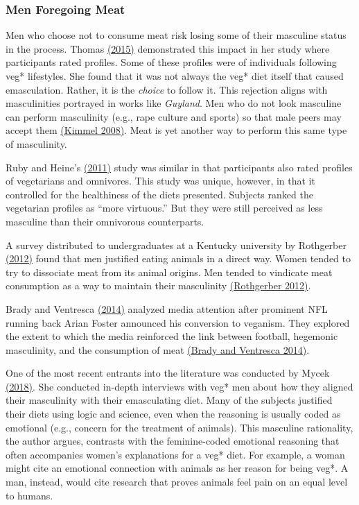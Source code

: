 \documentclass[twoside]{report}
\begin{document}
\subsubsection{Men Foregoing Meat}

Men who choose not to consume meat risk losing some of their masculine
status in the process. Thomas \hyperlink{thomas}{(2015)} demonstrated this impact in her study where participants rated profiles. Some of these profiles were of individuals following veg* lifestyles. She found that it was not always the veg* diet itself that caused emasculation. Rather, it is the
\emph{choice} to follow it. This rejection aligns with masculinities
portrayed in works like \emph{Guyland}. Men who do not look masculine can perform masculinity (e.g., rape culture and sports) so that male peers may accept them \hyperlink{kimmel}{(Kimmel 2008)}. Meat is yet another way
to perform this same type of masculinity.

Ruby and Heine's \hyperlink{ruby}{(2011)} study was similar in that participants also rated profiles of vegetarians and omnivores. This study was unique, however, in that it controlled for the healthiness of the diets
presented. Subjects ranked the vegetarian profiles as ``more virtuous.''
But they were still perceived as less masculine than their omnivorous
counterparts.

A survey distributed to undergraduates at a Kentucky
university by Rothgerber \hyperlink{rothgerber}{(2012)} found that men justified eating animals in a direct way. Women tended to try to dissociate meat from its animal origins. Men tended to vindicate meat consumption as a way to maintain their masculinity \hyperlink{rothgerber}{(Rothgerber 2012)}. 

Brady and Ventresca \hyperlink{brady}{(2014)} analyzed media attention after prominent NFL running back Arian Foster announced his conversion to veganism. They explored the extent to which the media reinforced the link between football, hegemonic masculinity, and the consumption of meat \hyperlink{brady}{(Brady and Ventresca 2014)}.

One of the most recent entrants into the literature was conducted by
Mycek \hyperlink{mycek}{(2018)}. She conducted in-depth interviews with veg* men about how they aligned their masculinity with their emasculating diet. Many of the subjects justified their diets using logic and science, even when the reasoning is usually coded as emotional (e.g., concern for the treatment
of animals). This masculine rationality, the author argues, contrasts
with the feminine-coded emotional reasoning that often accompanies
women's explanations for a veg* diet. For example, a woman might cite an
emotional connection with animals as her reason for being veg*. A man, instead, would cite research that proves animals feel pain on an equal
level to humans.
\end{document}
